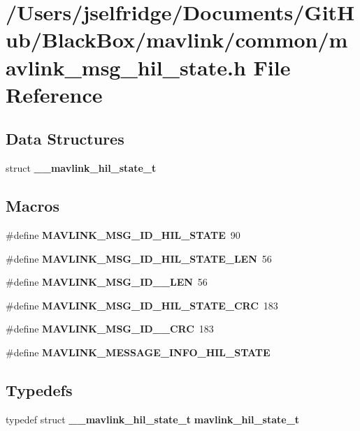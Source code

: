 \section{/\+Users/jselfridge/\+Documents/\+Git\+Hub/\+Black\+Box/mavlink/common/mavlink\+\_\+msg\+\_\+hil\+\_\+state.h File Reference}
\label{mavlink__msg__hil__state_8h}
\subsection*{Data Structures}
\begin{DoxyCompactItemize}
\item 
struct \textbf{ \+\_\+\+\_\+mavlink\+\_\+hil\+\_\+state\+\_\+t}
\end{DoxyCompactItemize}
\subsection*{Macros}
\begin{DoxyCompactItemize}
\item 
\#define \textbf{ M\+A\+V\+L\+I\+N\+K\+\_\+\+M\+S\+G\+\_\+\+I\+D\+\_\+\+H\+I\+L\+\_\+\+S\+T\+A\+TE}~90
\item 
\#define \textbf{ M\+A\+V\+L\+I\+N\+K\+\_\+\+M\+S\+G\+\_\+\+I\+D\+\_\+\+H\+I\+L\+\_\+\+S\+T\+A\+T\+E\+\_\+\+L\+EN}~56
\item 
\#define \textbf{ M\+A\+V\+L\+I\+N\+K\+\_\+\+M\+S\+G\+\_\+\+I\+D\+\_\+\_\+\+L\+EN}~56
\item 
\#define \textbf{ M\+A\+V\+L\+I\+N\+K\+\_\+\+M\+S\+G\+\_\+\+I\+D\+\_\+\+H\+I\+L\+\_\+\+S\+T\+A\+T\+E\+\_\+\+C\+RC}~183
\item 
\#define \textbf{ M\+A\+V\+L\+I\+N\+K\+\_\+\+M\+S\+G\+\_\+\+I\+D\+\_\+\_\+\+C\+RC}~183
\item 
\#define \textbf{ M\+A\+V\+L\+I\+N\+K\+\_\+\+M\+E\+S\+S\+A\+G\+E\+\_\+\+I\+N\+F\+O\+\_\+\+H\+I\+L\+\_\+\+S\+T\+A\+TE}
\end{DoxyCompactItemize}
\subsection*{Typedefs}
\begin{DoxyCompactItemize}
\item 
typedef struct \textbf{ \+\_\+\+\_\+mavlink\+\_\+hil\+\_\+state\+\_\+t} \textbf{ mavlink\+\_\+hil\+\_\+state\+\_\+t}
\end{DoxyCompactItemize}


